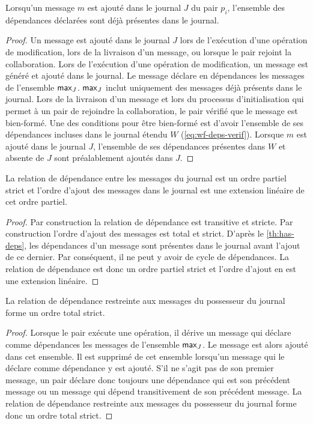 \begin{lemma}\label{th:has-deps}
Lorsqu'un message $m$ est ajouté dans le journal $J$ du pair $p_i$, l'ensemble des dépendances déclarées sont déjà présentes dans le journal.
\end{lemma} 
\begin{proof}
Un message est ajouté dans le journal $J$ lors de l'exécution d'une opération de modification, lors de la livraison d'un message, ou lorsque le pair rejoint la collaboration.
Lors de l'exécution d'une opération de modification, un message est généré et ajouté dans le journal.
Le message déclare en dépendances les messages de l'ensemble $\operatorname{\mathsf{max}}_J$.
$\operatorname{\mathsf{max}}_J$ inclut uniquement des messages déjà présents dans le journal.
Lors de la livraison d'un message et lors du processus d'initialisation qui permet à un pair de rejoindre la collaboration, le pair vérifié que le message est bien-formé.
Une des conditions pour être bien-formé est d'avoir l'ensemble de ses dépendances incluses dans le journal étendu $W$ (\autoref{eq:wf-deps-verif}).
Lorsque $m$ est ajouté dans le journal $J$, l'ensemble de ses dépendances présentes dans $W$ et absente de $J$ sont préalablement ajoutés dans $J$.
\end{proof}

\begin{lemma}
La relation de dépendance entre les messages du journal est un ordre partiel strict et l'ordre d'ajout des messages dans le journal est une extension linéaire de cet ordre partiel.
\end{lemma}
\begin{proof}
Par construction la relation de dépendance est transitive et stricte.
Par construction l'ordre d'ajout des messages est total et strict.
D'après le \autoref{th:has-deps}, les dépendances d'un message sont présentes dans le journal avant l'ajout de ce dernier.
Par conséquent, il ne peut y avoir de cycle de dépendances.
La relation de dépendance est donc un ordre partiel strict et l'ordre d'ajout en est une extension linéaire.
\end{proof}

\begin{lemma}\label{th:total-dep-owner}
La relation de dépendance restreinte aux messages du possesseur du journal forme un ordre total strict.
\end{lemma}
\begin{proof}
Lorsque le pair exécute une opération, il dérive un message qui déclare comme dépendances les messages de l'ensemble $\operatorname{\mathsf{max}}_J$.
Le message est alors ajouté dans cet ensemble.
Il est supprimé de cet ensemble lorsqu'un message qui le déclare comme dépendance y est ajouté.
S'il ne s'agit pas de son premier message, un pair déclare donc toujours une dépendance qui est son précédent message ou un message qui dépend transitivement de son précédent message.
La relation de dépendance restreinte aux messages du possesseur du journal forme donc un ordre total strict.
\end{proof}

